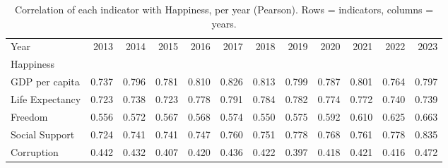 \begin{table}
\caption{Correlation of each indicator with Happiness, per year (Pearson). Rows = indicators, columns = years.}
\label{tab:corr-year}
\begin{tabular}{lrrrrrrrrrrr}
\toprule
Year & 2013 & 2014 & 2015 & 2016 & 2017 & 2018 & 2019 & 2020 & 2021 & 2022 & 2023 \\
Happiness &  &  &  &  &  &  &  &  &  &  &  \\
\midrule
GDP per capita & 0.737 & 0.796 & 0.781 & 0.810 & 0.826 & 0.813 & 0.799 & 0.787 & 0.801 & 0.764 & 0.797 \\
Life Expectancy & 0.723 & 0.738 & 0.723 & 0.778 & 0.791 & 0.784 & 0.782 & 0.774 & 0.772 & 0.740 & 0.739 \\
Freedom & 0.556 & 0.572 & 0.567 & 0.568 & 0.574 & 0.550 & 0.575 & 0.592 & 0.610 & 0.625 & 0.663 \\
Social Support & 0.724 & 0.741 & 0.741 & 0.747 & 0.760 & 0.751 & 0.778 & 0.768 & 0.761 & 0.778 & 0.835 \\
Corruption & 0.442 & 0.432 & 0.407 & 0.420 & 0.436 & 0.422 & 0.397 & 0.418 & 0.421 & 0.416 & 0.472 \\
\bottomrule
\end{tabular}
\end{table}
